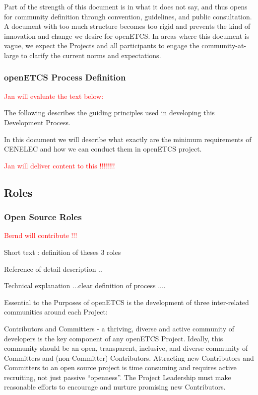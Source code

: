 \documentclass{template/openetcs_article}
\begin{document}
Part of the strength of this document is in what it does not say, and thus opens for community definition through convention, guidelines, and public consultation. A document with too much structure becomes too rigid and prevents the kind of innovation and change we desire for openETCS. In areas where this document is vague, we expect the Projects and all participants to engage the community-at-large to clarify the current norms and expectations.


\subsubsection{openETCS Process Definition}
\textcolor{red}{Jan will evaluate the text below:}

The following describes the guiding principles used in developing this Development Process.

In this document we will describe what exactly are the minimum requirements of CENELEC and how we can conduct them in openETCS project.

\textcolor{red}{Jan will deliver content to this !!!!!!!!}


\subsection{Roles}
\subsubsection[Open Source Roles]{Open Source Roles}
\textcolor{red}{Bernd will contribute !!!} 

Short text : definition of theses 3 roles

Reference of detail description ..

Technical explanation ...clear definition of process .... 

Essential to the Purposes of openETCS is the development of three inter-related communities around each Project:

Contributors and Committers - a thriving, diverse and active community of developers is the key component of any openETCS Project. Ideally, this community should be an open, transparent, inclusive, and diverse community of Committers and (non-Committer) Contributors. Attracting new Contributors and Committers to an open source project is time consuming and requires active recruiting, not just passive ``openness''. The Project Leadership must make reasonable efforts to encourage and nurture promising new Contributors.
\end{document}
